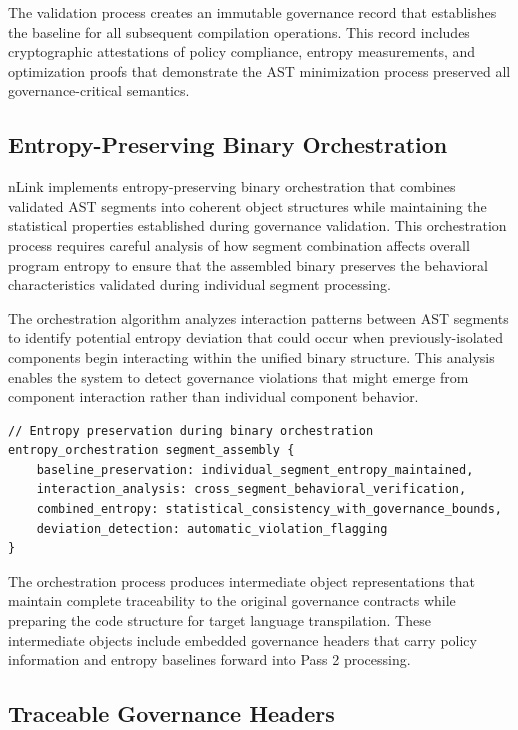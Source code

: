 The validation process creates an immutable governance record that establishes the baseline for all subsequent compilation operations. This record includes cryptographic attestations of policy compliance, entropy measurements, and optimization proofs that demonstrate the AST minimization process preserved all governance-critical semantics.

\subsection{Entropy-Preserving Binary Orchestration}

nLink implements entropy-preserving binary orchestration that combines validated AST segments into coherent object structures while maintaining the statistical properties established during governance validation. This orchestration process requires careful analysis of how segment combination affects overall program entropy to ensure that the assembled binary preserves the behavioral characteristics validated during individual segment processing.

The orchestration algorithm analyzes interaction patterns between AST segments to identify potential entropy deviation that could occur when previously-isolated components begin interacting within the unified binary structure. This analysis enables the system to detect governance violations that might emerge from component interaction rather than individual component behavior.

\begin{lstlisting}[style=riftlang, language=rift]
// Entropy preservation during binary orchestration
entropy_orchestration segment_assembly {
    baseline_preservation: individual_segment_entropy_maintained,
    interaction_analysis: cross_segment_behavioral_verification,
    combined_entropy: statistical_consistency_with_governance_bounds,
    deviation_detection: automatic_violation_flagging
}
\end{lstlisting}

The orchestration process produces intermediate object representations that maintain complete traceability to the original governance contracts while preparing the code structure for target language transpilation. These intermediate objects include embedded governance headers that carry policy information and entropy baselines forward into Pass 2 processing.

\subsection{Traceable Governance Headers}

